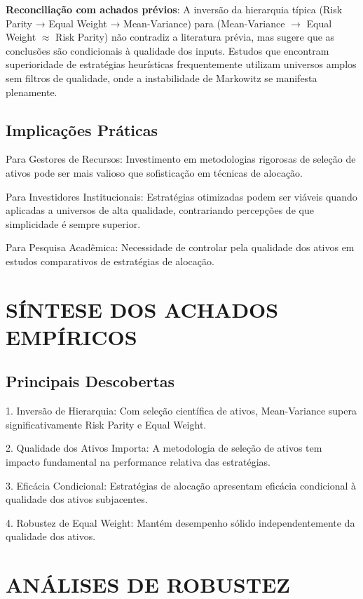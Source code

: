 \textbf{Reconciliação com achados prévios}: A inversão da hierarquia típica (Risk Parity → Equal Weight → Mean-Variance) para (Mean-Variance $\rightarrow$ Equal Weight $\approx$ Risk Parity) não contradiz a literatura prévia, mas sugere que as conclusões são condicionais à qualidade dos inputs. Estudos que encontram superioridade de estratégias heurísticas frequentemente utilizam universos amplos sem filtros de qualidade, onde a instabilidade de Markowitz se manifesta plenamente.

\subsection{Implicações Práticas}

Para Gestores de Recursos: Investimento em metodologias rigorosas de seleção de ativos pode ser mais valioso que sofisticação em técnicas de alocação.

Para Investidores Institucionais: Estratégias otimizadas podem ser viáveis quando aplicadas a universos de alta qualidade, contrariando percepções de que simplicidade é sempre superior.

Para Pesquisa Acadêmica: Necessidade de controlar pela qualidade dos ativos em estudos comparativos de estratégias de alocação.

\section{SÍNTESE DOS ACHADOS EMPÍRICOS}

\subsection{Principais Descobertas}

1. Inversão de Hierarquia: Com seleção científica de ativos, Mean-Variance supera significativamente Risk Parity e Equal Weight.

2. Qualidade dos Ativos Importa: A metodologia de seleção de ativos tem impacto fundamental na performance relativa das estratégias.

3. Eficácia Condicional: Estratégias de alocação apresentam eficácia condicional à qualidade dos ativos subjacentes.

4. Robustez de Equal Weight: Mantém desempenho sólido independentemente da qualidade dos ativos.

\section{ANÁLISES DE ROBUSTEZ}

